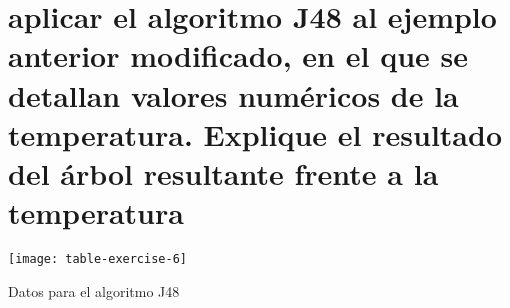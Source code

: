 \documentclass[10pt, a4paper,spanish]{article}
\begin{document}
		\paragraph{}

	\section{aplicar el algoritmo J48 al ejemplo anterior modificado, en el que se detallan valores numéricos de la temperatura. Explique el resultado del árbol resultante frente a la temperatura}

		\begin{table}
			\begin{center}
				\texttt{[image: table-exercise-6]}
				\caption{Datos para el algoritmo J48}
			\end{center}
		\end{table}

		\paragraph{}

	\nocite{subject:taa}
	
  
\end{document}
